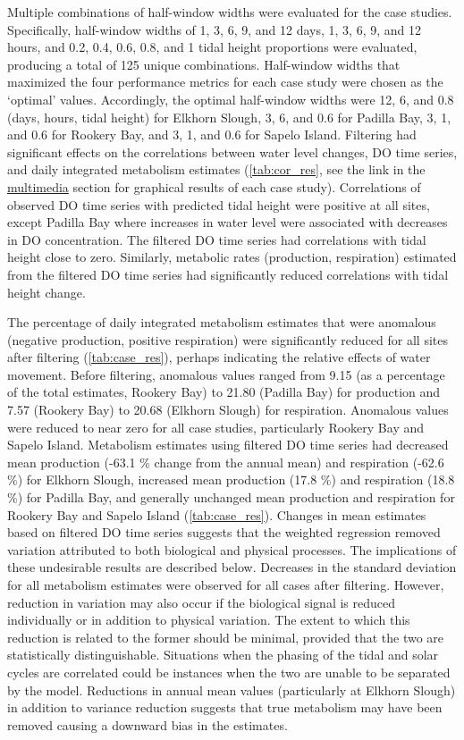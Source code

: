 \documentclass[letterpaper,12pt,oneside]{article}\usepackage[]{graphicx}\usepackage[]{color}
\begin{document}
Multiple combinations of half-window widths were evaluated for the case studies.  Specifically, half-window widths of 1, 3, 6, 9, and 12 days, 1, 3, 6, 9, and 12 hours, and 0.2, 0.4, 0.6, 0.8, and 1 tidal height proportions were evaluated, producing a total of 125 unique combinations.  Half-window widths that maximized the four performance metrics for each case study were chosen as the `optimal' values.  Accordingly, the optimal half-window widths were 12, 6, and 0.8 (days, hours, tidal height) for Elkhorn Slough, 3, 6, and 0.6 for Padilla Bay, 3, 1, and 0.6 for Rookery Bay, and 3, 1, and 0.6 for Sapelo Island.  Filtering had significant effects on the correlations between water level changes, \ac{DO} time series, and daily integrated metabolism estimates (\cref{tab:cor_res}, see the link in the \hyperref[multi]{multimedia} section for graphical results of each case study).  Correlations of observed \ac{DO} time series with predicted tidal height were positive at all sites, except Padilla Bay where increases in water level were associated with decreases in \ac{DO}  concentration.  The filtered \ac{DO} time series had correlations with tidal height close to zero. Similarly, metabolic rates (production, respiration) estimated from the filtered \ac{DO} time series had significantly reduced correlations with tidal height change. 

The percentage of daily integrated metabolism estimates that were anomalous (negative production, positive respiration) were significantly reduced for all sites after filtering (\cref{tab:case_res}), perhaps indicating the relative effects of water movement.  Before filtering, anomalous values ranged from 9.15 (as a percentage of the total estimates, Rookery Bay) to 21.80 (Padilla Bay) for production and 7.57 (Rookery Bay) to 20.68 (Elkhorn Slough) for respiration. Anomalous values were reduced to near zero for all case studies, particularly Rookery Bay and Sapelo Island.  Metabolism estimates using filtered \ac{DO} time series had decreased mean production (-63.1 \% change from the annual mean) and respiration (-62.6 \%) for Elkhorn Slough, increased mean production (17.8 \%) and respiration (18.8 \%) for Padilla Bay, and generally unchanged mean production and respiration for Rookery Bay and Sapelo Island (\cref{tab:case_res}).  Changes in mean estimates based on filtered \ac{DO} time series suggests that the weighted regression removed variation attributed to both biological and physical processes.  The implications of these undesirable results are described below.  Decreases in the standard deviation for all metabolism estimates were observed for all cases after filtering.  However, reduction in variation may also occur if the biological signal is reduced individually or in addition to physical variation.  The extent to which this reduction is related to the former should be minimal, provided that the two are statistically distinguishable.  Situations when the phasing of the tidal and solar cycles are correlated could be instances when the two are unable to be separated by the model.  Reductions in annual mean values (particularly at Elkhorn Slough) in addition to variance reduction suggests that true metabolism may have been removed causing a downward bias in the estimates.
\end{document}
